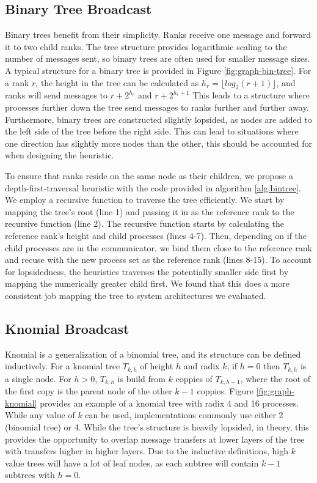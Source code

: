 \subsection{Binary Tree Broadcast}
Binary trees benefit from their simplicity.
Ranks receive one message and forward it to two child ranks.
The tree structure provides logarithmic scaling to the number of messages sent, so binary trees are often used for smaller message sizes. 
A typical structure for a binary tree is provided in Figure \ref{fig:graph-bin-tree}.
For a rank $r$, the height in the tree can be calculated as $h_r = \lfloor log_2(r+1) \rfloor$, and ranks will send messages to $r + 2^{h_r}$ and $r + 2^{h_r + 1}$
This leads to a structure where processes further down the tree send messages to ranks further and further away.
Furthermore, binary trees are constructed slightly lopsided,  as nodes are added to the left side of the tree before the right side. 
This can lead to situations where one direction has slightly more nodes than the other, this should be accounted for when designing the heuristic.

To ensure that ranks reside on the same node as their children, we propose a depth-first-traversal heuristic with the code provided in algorithm \ref{alg:bintree}.
We employ a recursive function to traverse the tree efficiently. 
We start by mapping the tree's root (line 1) and passing it in as the reference rank to the recursive function (line 2).
The recursive function starts by calculating the reference rank's height and child processes (lines 4-7). 
Then, depending on if the child processes are in the communicator, we bind them close to the reference rank and recuse with the new process set as the reference rank (lines 8-15).
To account for lopsidedness, the heuristics traverses the potentially smaller side first by mapping the numerically greater child first.
We found that this does a more consistent job mapping the tree to system architectures we evaluated.




\subsection{Knomial Broadcast}
Knomial is a generalization of a binomial tree, and its structure can be defined inductively.
For a knomial tree $T_{k,h}$ of height $h$ and radix $k$, if $h=0$ then $T_{k,h}$ is a single node. For $h>0$, $T_{k,h}$ is build from $k$ coppies of $T_{k,h-1}$, where the root of the first copy is the parent node of the other $k-1$ coppies.
Figure \ref{fig:graph-knomial} provides an example of a knomial tree with radix 4 and 16 processes.
While any value of $k$ can be used, implementations commonly use either 2 (binomial tree) or 4. 
While the tree's structure is heavily lopsided, in theory, this provides the opportunity to overlap message transfers at lower layers of the tree with transfers higher in higher layers.
Due to the inductive definitions, high $k$ value trees will have a lot of leaf nodes, as each subtree will contain $k-1$ subtrees with $h=0$.

